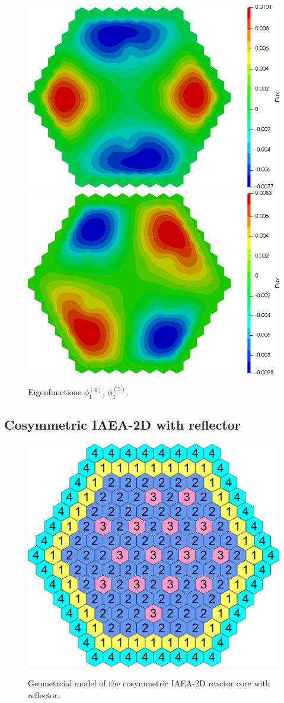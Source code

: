 \documentclass[authoryear]{elsarticle}
\begin{document}
\begin{figure}[H]
\begin{center}
	\includegraphics[width=0.49\linewidth]{iaea_with/alpha_delayed_sp3_u1_4.png}
	\includegraphics[width=0.49\linewidth]{iaea_with/alpha_delayed_sp3_u1_5.png}\\
	\caption{Eigenfunctions $\phi_1^{(4)}$, $\phi_1^{(5)}$.}
	\label{fig:iaea_with_fun_del_3}
\end{center}
\end{figure}


\subsection{Cosymmetric IAEA-2D with reflector}
\begin{figure}[h]
\begin{center}
	\includegraphics[width=0.75\linewidth]{iaea_cosym.png}\\
	\caption{Geometrcial model of the cosymmetric IAEA-2D reactor core with reflector.}
	\label{fig:iaea_cosym}
\end{center}
\end{figure}
\end{document}
